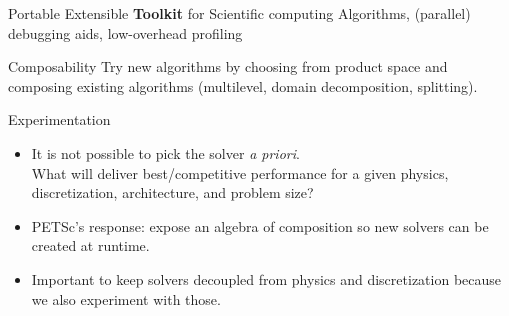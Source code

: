 \begin{frame}{Portable Extensible {\bf Toolkit} for Scientific computing}
Algorithms, (parallel) debugging aids, low-overhead profiling
\begin{block}{Composability}
Try new algorithms by choosing from product space and composing
existing algorithms (multilevel, domain decomposition, splitting).
\end{block}
\begin{block}{Experimentation}
\begin{itemize}
  \item It is not possible to pick the solver \emph{a priori}. \\
  What will deliver best/competitive performance for a given physics, discretization, architecture, and problem size?
  \item PETSc's response: expose an algebra of composition so new solvers can be created at runtime.
  \item Important to keep solvers decoupled from physics and discretization because we also experiment with those. 
\end{itemize}
\end{block}
\end{frame}

